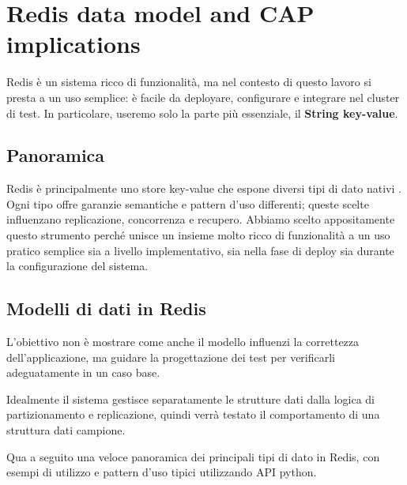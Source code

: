\documentclass{article}
\begin{document}
\section{Redis data model and CAP implications}
Redis è un sistema ricco di funzionalità, ma nel contesto di questo lavoro si presta a un uso semplice: è facile da deployare, configurare e integrare nel cluster di test. In particolare, %
useremo solo la parte più essenziale, il \textbf{String key-value}. %

\subsection{Panoramica}
Redis è principalmente uno store key-value che espone diversi tipi di dato nativi \cite{RedisDocs}. %
Ogni tipo offre garanzie semantiche e pattern d'uso differenti; queste scelte influenzano replicazione, concorrenza e recupero.
Abbiamo scelto appositamente questo strumento perché unisce un insieme molto ricco di funzionalità %
a un uso pratico semplice sia a livello implementativo, sia nella fase di deploy sia durante la %
configurazione del sistema. %


\subsection{Modelli di dati in Redis}
L’obiettivo non è mostrare come anche il modello influenzi la correttezza %
dell’applicazione, ma guidare la progettazione dei test per verificarli adeguatamente in un caso base. %


Idealmente il sistema gestisce separatamente le strutture dati dalla logica di partizionamento e replicazione, 
quindi verrà testato il comportamento di una struttura dati campione.

Qua a seguito una veloce panoramica dei principali tipi di dato in Redis, con esempi di utilizzo e pattern d'uso tipici %
utilizzando API python. %
\end{document}
